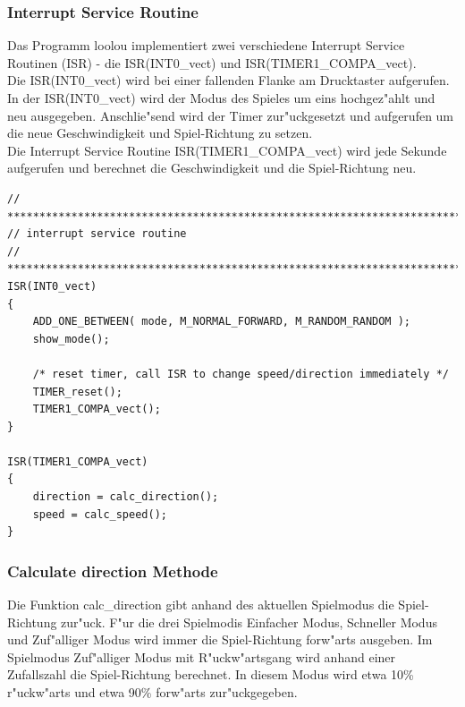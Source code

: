 \subsubsection{Interrupt Service Routine}

Das Programm loolou implementiert zwei verschiedene Interrupt Service Routinen (ISR) - die ISR(INT0\_vect) und ISR(TIMER1\_COMPA\_vect). \\
Die ISR(INT0\_vect) wird bei einer fallenden Flanke am Drucktaster aufgerufen. In der ISR(INT0\_vect) wird der Modus des Spieles um eins hochgez"ahlt und neu ausgegeben. Anschlie"send wird der Timer zur"uckgesetzt und aufgerufen um die neue Geschwindigkeit und Spiel-Richtung zu setzen. \\
Die Interrupt Service Routine ISR(TIMER1\_COMPA\_vect) wird jede Sekunde aufgerufen und berechnet die Geschwindigkeit und die Spiel-Richtung neu.

\vspace{0.5cm}
\begin{lstlisting}[caption={Interrupt Service Routine},label=lst:isr]
// ****************************************************************************
// interrupt service routine
// ***************************************************************************/
ISR(INT0_vect)
{
	ADD_ONE_BETWEEN( mode, M_NORMAL_FORWARD, M_RANDOM_RANDOM );
	show_mode();

	/* reset timer, call ISR to change speed/direction immediately */
	TIMER_reset();
	TIMER1_COMPA_vect();
}

ISR(TIMER1_COMPA_vect)
{
	direction = calc_direction();
	speed = calc_speed();
}
\end{lstlisting}
\vspace{0.5cm}

\subsubsection{Calculate direction Methode}

Die Funktion calc\_direction gibt anhand des aktuellen Spielmodus die Spiel-Richtung zur"uck.
F"ur die drei Spielmodis \grqq{}Einfacher Modus\grqq{}, \grqq{}Schneller Modus\grqq{} und \grqq{}Zuf"alliger Modus\grqq{} wird immer die Spiel-Richtung \grqq{}forw"arts\grqq{} ausgeben.
Im Spielmodus \grqq{}Zuf"alliger Modus mit R"uckw"artsgang\grqq{} wird anhand einer Zufallszahl die Spiel-Richtung berechnet. In diesem Modus wird etwa 10\% \grqq{}r"uckw"arts\grqq{} und etwa 90\% \grqq{}forw"arts\grqq{} zur"uckgegeben.

